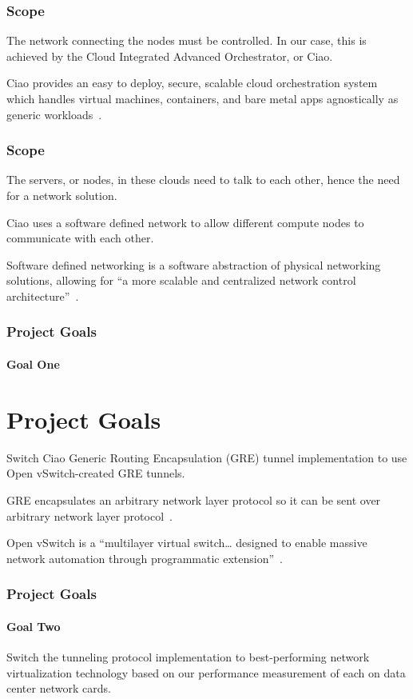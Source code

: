 \documentclass[pdf]{beamer}
\begin{document}
\begin{frame}
	\frametitle{Scope}
	The network connecting the nodes must be controlled. In our case, this
	is achieved by the Cloud Integrated Advanced Orchestrator, or Ciao.

	Ciao provides an easy to deploy, secure, scalable cloud orchestration
	system which handles virtual machines, containers, and bare metal apps
	agnostically as generic workloads~\cite{ciao}.
\end{frame}

\begin{frame}
	\frametitle{Scope}
	The servers, or nodes, in these clouds need to talk to each other, hence
	the need for a network solution.

	Ciao uses a software defined network to allow different compute nodes to
	communicate with each other.

	Software defined networking is a software abstraction of physical
	networking solutions, allowing for ``a more scalable and centralized
	network control architecture''~\cite{goransson}.
\end{frame}

\begin{frame}
	\frametitle{Project Goals}
	\framesubtitle{Goal One}
	\section{Project Goals}
	Switch Ciao Generic Routing Encapsulation (GRE) tunnel implementation to
	use Open vSwitch-created GRE tunnels.

	\begin{description}[style=nextline]
		\item[Generic Routing Encapsulation (GRE)]
			GRE encapsulates an arbitrary network layer protocol so
			it can be sent over arbitrary network layer
			protocol~\cite{rfc1701}.
		\item[Open vSwitch (OVS)]
			Open vSwitch is a ``multilayer virtual switch\ldots
			designed to enable massive network automation through
			programmatic extension''~\cite{ovs}.
	\end{description}
\end{frame}

\begin{frame}
	\frametitle{Project Goals}
	\framesubtitle{Goal Two}
	Switch the tunneling protocol implementation to best-performing network
	virtualization technology based on our performance measurement of each
	on data center network cards.
\end{frame}
\end{document}
